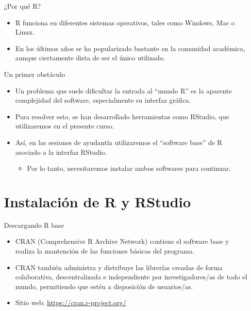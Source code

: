 \documentclass[
  13pt,
  ignorenonframetext,
]{beamer}
\providecommand{\tightlist}{%
  \setlength{\itemsep}{0pt}\setlength{\parskip}{0pt}}
\begin{document}
\begin{frame}{¿Por qué R?}
\label{por-quuxe9-r-1}
\begin{itemize}
\item
  R funciona en diferentes sistemas operativos, tales como Windows, Mac
  o Linux.
\item
  En los últimos años se ha popularizado bastante en la comunidad
  académica, aunque ciertamente dista de ser el único utilizado.
\end{itemize}
\end{frame}

\begin{frame}{Un primer obstáculo}
\label{un-primer-obstuxe1culo}
\begin{itemize}
\item
  Un problema que suele dificultar la entrada al ``mundo R'' es la
  aparente complejidad del software, especialmente su interfaz gráfica.
\item
  Para resolver esto, se han desarrollado herramientas como RStudio, que
  utilizaremos en el presente curso.
\item
  Así, en las sesiones de ayudantía utilizaremos el ``software base'' de
  R asociado a la interfaz RStudio.

  \begin{itemize}
  \tightlist
  \item
    Por lo tanto, necesitaremos instalar ambos softwares para continuar.
  \end{itemize}
\end{itemize}
\end{frame}

\section{Instalación de R y
RStudio}\label{instalaciuxf3n-de-r-y-rstudio}

\begin{frame}{Descargando R base}
\label{descargando-r-base}
\begin{itemize}
\item
  CRAN (Comprehensive R Archive Network) contiene el software base y
  realiza la mantención de las funciones básicas del programa.
\item
  CRAN también administra y distribuye las librerías creadas de forma
  colaborativa, descentralizada e independiente por investigadores/as de
  todo el mundo, permitiendo que estén a disposición de usuarios/as.
\item
  Sitio web: \url{https://cran.r-project.org/}
\end{itemize}
\end{frame}
\end{document}
